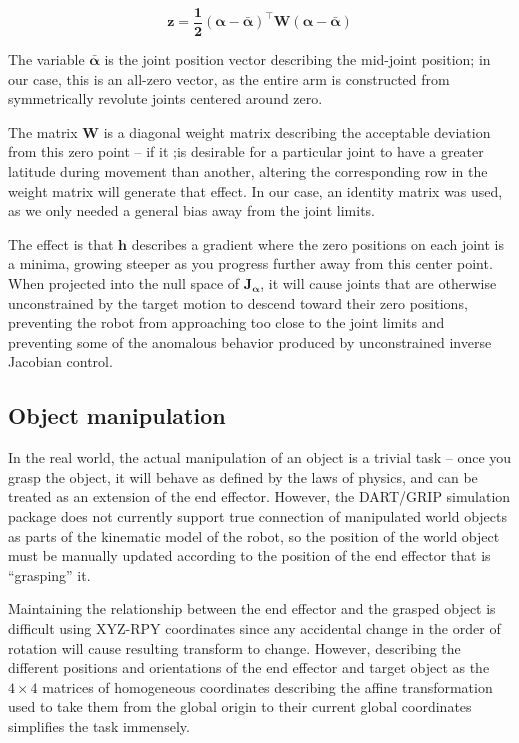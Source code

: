 \documentclass[10pt, conference]{IEEEtran}
\begin{document}
\begin{itemize}
     \begin{equation}
     \label{eq:z}
     \mathbf{ z = \frac{1}{2}(\alpha - \bar{\alpha})^{\top}W(\alpha -
     \bar{\alpha})}
     \end{equation}

     The variable \(\mathbf{\bar{\alpha}}\) is the joint position vector
     describing the mid-joint position; in our case, this is an all-zero
     vector, as the entire arm is constructed from symmetrically
     revolute joints centered around zero.

     The matrix \( \mathbf{W} \) is a diagonal weight matrix describing
     the acceptable deviation from this zero point -- if it ;is desirable
     for a particular joint to have a greater latitude during movement
     than another, altering the corresponding row in the weight matrix
     will generate that effect. In our case, an identity matrix was
     used, as we only needed a general bias away from the joint limits.

     The effect is that \(\mathbf{h}\) describes a gradient where the
     zero positions on each joint is a minima, growing steeper as you
     progress further away from this center point. When projected into
     the null space of \(\mathbf{J_\alpha}\), it will cause joints that
     are otherwise unconstrained by the target motion to descend toward
     their zero positions, preventing the robot from approaching too
     close to the joint limits and preventing some of the anomalous
     behavior produced by unconstrained inverse Jacobian control.

\end{itemize} %
\subsection{Object manipulation}
\label{sec-3-4}

   In the real world, the actual manipulation of an object is a trivial
   task -- once you grasp the object, it will behave as defined by the
   laws of physics, and can be treated as an extension of the end
   effector. However, the DART/GRIP simulation package does not
   currently support true connection of manipulated world objects as
   parts of the kinematic model of the robot, so the position of the
   world object must be manually updated according to the position of
   the end effector that is ``grasping'' it.

   Maintaining the relationship between the end effector and the grasped
   object is difficult using XYZ-RPY coordinates since any accidental
   change in the order of rotation will cause resulting transform to
   change. However, describing the different positions and orientations
   of the end effector and target object as the \(4 \times 4\) matrices
   of homogeneous coordinates describing the affine transformation used
   to take them from the global origin to their current global
   coordinates simplifies the task immensely.
\end{document}
